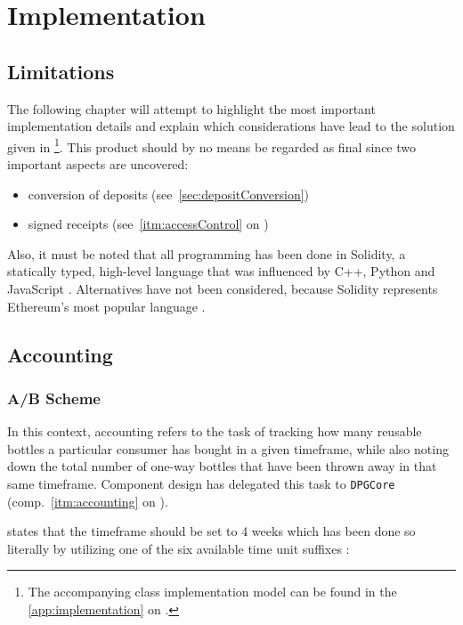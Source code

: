 
\chapter{Implementation}
\label{chp:implementation}

\section{Limitations}
The following chapter will attempt to highlight the most important implementation details and explain which considerations have lead to the solution given in \cite{depositRefundGitHub} \footnote{The accompanying class implementation model can be found in the \autoref{app:implementation} on .}. This product should by no means be regarded as final since two important aspects are uncovered:

\begin{itemize}
  \item conversion of deposits (see~\ref{sec:depositConversion})
  \item signed receipts (see~\ref{itm:accessControl} on )
\end{itemize}

Also, it must be noted that all programming has been done in Solidity, a statically typed, high-level language that was influenced by C++, Python and JavaScript \cite[p.~5]{solidityDocs}. Alternatives have not been considered, because Solidity represents Ethereum's most popular language \cite[p.~21]{Antonopoulos.2018}.

\pagebreak

\section{Accounting}

\subsection{A/B Scheme}
In this context, accounting refers to the task of tracking how many reusable bottles a particular consumer has bought in a given timeframe, while also noting down the total number of one-way bottles that have been thrown away in that same timeframe. Component design has delegated this task to \texttt{DPGCore} (comp.~\ref{itm:accounting} on ). 

 states that the timeframe should be set to 4 weeks which has been done so literally by utilizing one of the six available time unit suffixes \cite[p.~68]{solidityDocs}:

